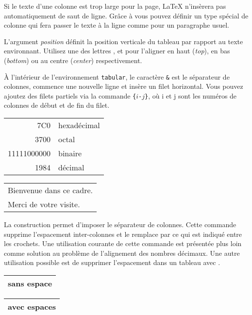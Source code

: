 Si le texte d'une colonne est trop large pour la page, \LaTeX{}
n'insèrera pas automatiquement de saut de ligne. Grâce à
 vous pouvez définir un type spécial de
colonne qui fera passer le texte à la ligne comme pour un paragraphe
usuel.

L'argument \emph{position} définit la position verticale du tableau
par rapport au texte environnant. Utilisez une des lettres ,
 et  pour l'aligner en haut (\emph{top}), en bas
(\emph{bottom}) ou au centre (\emph{center}) respectivement.

À l'intérieur de l'environnement \texttt{tabular}, le caractère
\texttt{\&} est le séparateur de colonnes, \ci{\bs} commence une nouvelle
ligne et  insère un filet horizontal. Vous pouvez ajoutez
des filets partiels via la commande
\texttt{\{}$i$\texttt{-}$j$\texttt{\}}, où i et j
sont les numéros de colonnes de début et de fin du filet.
\index{\&}

\begin{example}
\begin{tabular}{|r|l|}
\hline
7C0 & hexadécimal \\
3700 & octal \\
11111000000 & binaire \\
\hline \hline
1984 & décimal \\
\hline
\end{tabular}
\end{example}

\begin{example}
\begin{tabular}{|p{4.7cm}|}
\hline
Bienvenue dans ce
cadre.\\
Merci de votre visite.\\
\hline
\end{tabular}

\end{example}

La construction  permet d'imposer le séparateur de
colonnes. Cette commande supprime l'espacement inter-colonnes et le
remplace par ce qui est indiqué entre les crochets. Une utilisation
courante de cette commande est présentée plus loin comme solution au
problème de l'alignement des nombres décimaux. Une autre utilisation
possible est de supprimer l'espacement dans un tableau avec
.

\begin{example}
\begin{tabular}{@{} l @{}}
\hline
sans espace\\\hline
\end{tabular}
\end{example}
\begin{example}
\begin{tabular}{l}
\hline
avec espaces\\
\hline
\end{tabular}
\end{example}

